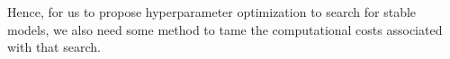  

  
  
 

 
 
 Hence, for us to propose hyperparameter optimization
 to search for stable models, we also need some method
 to tame the computational costs associated with that search.
  
